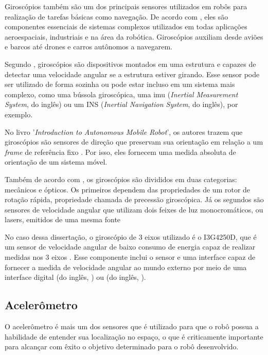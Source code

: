 \documentclass[acronym, symbols, table, deposito]{fei}
\begin{document}
				Giroscópios também são um dos principais sensores utilizados em robôs para realização de tarefas básicas como navegação. De acordo com \textcite{jeremydingman2020}, eles são componentes essenciais de sistemas complexos utilizados em todas aplicações aeroespaciais, industriais e na área da robótica. Giroscópios auxiliam desde aviões e barcos até drones e carros autônomos a navegarem.
				
				Segundo \textcite{s17102284}, giroscópios são dispositivos montados em uma estrutura e capazes de detectar uma velocidade angular se a estrutura estiver girando. Esse sensor pode ser utilizado de forma sozinha ou pode estar incluso em um sistema mais complexo, como uma bússola giroscópica, uma \acrshort{imu} (\textit{Inertial Measurement System}, do inglês) ou um INS (\textit{Inertial Navigation System}, do inglês), por exemplo.
				
				No livro '\textit{Introduction to Autonomous Mobile Robot}', os autores trazem que giroscópios são sensores de direção que preservam sua orientação em relação a um \textit{frame} de referência fixo \cite{siegwart2011introduction}. Por isso, eles fornecem uma medida absoluta de orientação de um sistema móvel. 
				
				Também de acordo com \textcite{siegwart2011introduction}, os giroscópios são divididos em duas categorias: mecânicos e ópticos. Os primeiros dependem das propriedades de um rotor de rotação rápida, propriedade chamada de precessão giroscópica. Já os segundos são sensores de velocidade angular que utilizam dois feixes de luz monocromáticos, ou lasers, emitidos de uma mesma fonte
				
				No caso dessa dissertação, o giroscópio de 3 eixos utilizado é o I3G4250D, que é um sensor de velocidade angular de baixo consumo de energia capaz de realizar medidas nos 3 eixos \cite{datasheet_gyro}. Esse componente inclui o sensor e uma interface capaz de fornecer a medida de velocidade angular ao mundo externo por meio de uma interface digital  (do inglês, ) ou  (do inglês, ).
			
			\subsection{Acelerômetro} \label{sec:sensores_acelerometro}
			
				O acelerômetro é mais um dos sensores que é utilizado para que o robô possua a habilidade de entender sua localização no espaço, o que é criticamente importante para alcançar com êxito o objetivo determinado para o robô desenvolvido.
			
\end{document}
